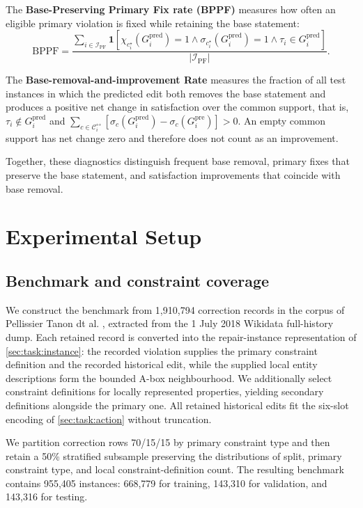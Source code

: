 \documentclass[a4paper,UKenglish,cleveref,autoref,thm-restate]{tgdk-v2021}
\newcommand{\bppf}{\mathrm{BPPF}}
\newcommand{\Gpre}{G_i^{\mathrm{pre}}}
\newcommand{\Gpred}{G_i^{\mathrm{pred}}}
\begin{document}
The \textbf{Base-Preserving Primary Fix rate (BPPF)} measures how often an eligible primary violation is fixed while retaining the base statement:
\[
\bppf
=\frac{\sum_{i\in\mathcal{I}_{\mathrm{PF}}}
\mathbf{1}[\chi_{c_i^\star}(\Gpred)=1
\land \sigma_{c_i^\star}(\Gpred)=1
\land \tau_i\in\Gpred]}
{|\mathcal{I}_{\mathrm{PF}}|}.
\]

The \textbf{Base-removal-and-improvement Rate} measures the fraction of all test instances in which the predicted edit both removes the base statement and produces a positive net change in satisfaction over the common support, that is, \(\tau_i\notin\Gpred\) and \(\sum_{c\in\mathcal{C}_i^{\leftrightarrow}}[\sigma_c(\Gpred)-\sigma_c(\Gpre)]>0\). An empty common support has net change zero and therefore does not count as an improvement.

Together, these diagnostics distinguish frequent base removal, primary fixes that preserve the base statement, and satisfaction improvements that coincide with base removal.

\section{Experimental Setup}
\label{sec:experiments}

\subsection{Benchmark and constraint coverage}
\label{sec:benchmark}

We construct the benchmark from 1,910,794 correction records in the corpus of Pellissier Tanon dt al. \cite{pellissier2019learning,pellissier2021neural}, extracted from the 1 July 2018 Wikidata full-history dump. Each retained record is converted into the repair-instance representation of \cref{sec:task:instance}: the recorded violation supplies the primary constraint definition and the recorded historical edit, while the supplied local entity descriptions form the bounded A-box neighbourhood. We additionally select constraint definitions for locally represented properties, yielding secondary definitions alongside the primary one. All retained historical edits fit the six-slot encoding of \cref{sec:task:action} without truncation.

We partition correction rows 70/15/15 by primary constraint type and then retain a 50\% stratified subsample preserving the distributions of split, primary constraint type, and local constraint-definition count. The resulting benchmark contains 955,405 instances: 668,779 for training, 143,310 for validation, and 143,316 for testing. %
\end{document}

